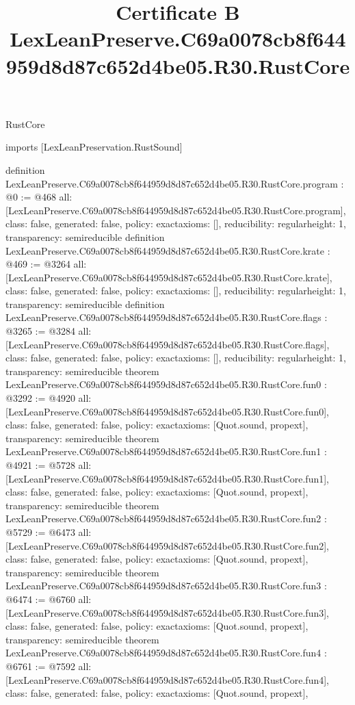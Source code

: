 \begin{lexlean}{RustCore}
\title{Certificate B LexLeanPreserve.C69a0078cb8f644959d8d87c652d4be05.R30.RustCore}
\begin{coremodule}
imports [LexLeanPreservation.RustSound]

definition LexLeanPreserve.C69a0078cb8f644959d8d87c652d4be05.R30.RustCore.program : @0 := @468 {
  all: [LexLeanPreserve.C69a0078cb8f644959d8d87c652d4be05.R30.RustCore.program],
  class: false,
  generated: false,
  policy: exact{axioms: []},
  reducibility: regular{height: 1},
  transparency: semireducible
}
definition LexLeanPreserve.C69a0078cb8f644959d8d87c652d4be05.R30.RustCore.krate : @469 := @3264 {
  all: [LexLeanPreserve.C69a0078cb8f644959d8d87c652d4be05.R30.RustCore.krate],
  class: false,
  generated: false,
  policy: exact{axioms: []},
  reducibility: regular{height: 1},
  transparency: semireducible
}
definition LexLeanPreserve.C69a0078cb8f644959d8d87c652d4be05.R30.RustCore.flags : @3265 := @3284 {
  all: [LexLeanPreserve.C69a0078cb8f644959d8d87c652d4be05.R30.RustCore.flags],
  class: false,
  generated: false,
  policy: exact{axioms: []},
  reducibility: regular{height: 1},
  transparency: semireducible
}
theorem LexLeanPreserve.C69a0078cb8f644959d8d87c652d4be05.R30.RustCore.fun0 : @3292 := @4920 {
  all: [LexLeanPreserve.C69a0078cb8f644959d8d87c652d4be05.R30.RustCore.fun0],
  class: false,
  generated: false,
  policy: exact{axioms: [Quot.sound, propext]},
  transparency: semireducible
}
theorem LexLeanPreserve.C69a0078cb8f644959d8d87c652d4be05.R30.RustCore.fun1 : @4921 := @5728 {
  all: [LexLeanPreserve.C69a0078cb8f644959d8d87c652d4be05.R30.RustCore.fun1],
  class: false,
  generated: false,
  policy: exact{axioms: [Quot.sound, propext]},
  transparency: semireducible
}
theorem LexLeanPreserve.C69a0078cb8f644959d8d87c652d4be05.R30.RustCore.fun2 : @5729 := @6473 {
  all: [LexLeanPreserve.C69a0078cb8f644959d8d87c652d4be05.R30.RustCore.fun2],
  class: false,
  generated: false,
  policy: exact{axioms: [Quot.sound, propext]},
  transparency: semireducible
}
theorem LexLeanPreserve.C69a0078cb8f644959d8d87c652d4be05.R30.RustCore.fun3 : @6474 := @6760 {
  all: [LexLeanPreserve.C69a0078cb8f644959d8d87c652d4be05.R30.RustCore.fun3],
  class: false,
  generated: false,
  policy: exact{axioms: [Quot.sound, propext]},
  transparency: semireducible
}
theorem LexLeanPreserve.C69a0078cb8f644959d8d87c652d4be05.R30.RustCore.fun4 : @6761 := @7592 {
  all: [LexLeanPreserve.C69a0078cb8f644959d8d87c652d4be05.R30.RustCore.fun4],
  class: false,
  generated: false,
  policy: exact{axioms: [Quot.sound, propext]},
}
\end{coremodule}
\end{lexlean}
